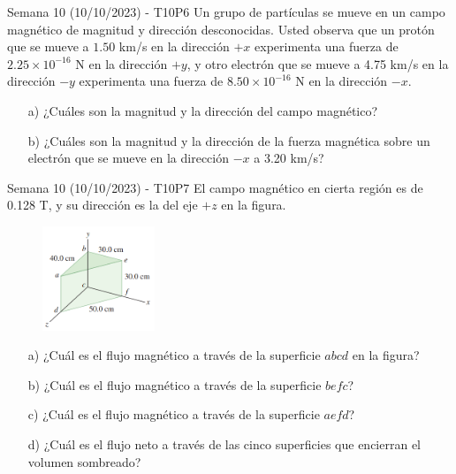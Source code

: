 \begin{frame}{Semana 10 (10/10/2023) - T10P6}
    Un grupo de partículas se mueve en un campo magnético de magnitud y dirección desconocidas. Usted observa que un protón
que se mueve a $1.50$ km/s en la dirección $+x$ experimenta una fuerza
de $2.25 \times 10^{-16}$ N en la dirección $+y$, y otro electrón que se mueve a
4.75 km/s en la dirección $-y$ experimenta una fuerza de $8.50 \times 10^{-16}$ N
en la dirección $-x$.
\begin{itemize}
    \item[a)] ¿Cuáles son la magnitud y la dirección del
campo magnético?
    \item[b)] ¿Cuáles son la magnitud y la dirección de la
fuerza magnética sobre un electrón que se mueve en la dirección $-x$
a 3.20 km/s?
\end{itemize}
\end{frame}

\begin{frame}{Semana 10 (10/10/2023) - T10P7}
    El campo magnético en cierta región es de 0.128 T, y su
dirección es la del eje $+z$ en la
figura.

\begin{figure}
    \centering
    \includegraphics[width=0.3\textwidth]{figures/t8p7.png}
\end{figure}

\begin{itemize}
    \item[a)] ¿Cuál es el flujo
magnético a través de la superficie
$abcd$ en la figura?
    \item[b)] ¿Cuál es el
flujo magnético a través de la
superficie $befc$?
    \item[c)] ¿Cuál es el flujo
magnético a través de la superficie
$aefd$?
    \item[d)] ¿Cuál es el flujo neto a
través de las cinco superficies que
encierran el volumen sombreado?
\end{itemize}
\end{frame}

